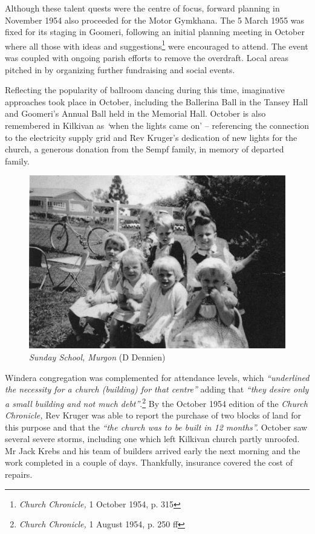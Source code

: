 Although these talent quests were the centre of focus, forward planning in November 1954 also proceeded for the Motor Gymkhana. The 5 March 1955 was fixed for its staging in Goomeri, following an initial planning meeting in October where all those with ideas and suggestions\footnote{\emph{Church Chronicle,} 1 October 1954, p. 315} were encouraged to attend. The event was coupled with ongoing parish efforts to remove the overdraft. Local areas pitched in by organizing further fundraising and social events.


Reflecting the popularity of ballroom dancing during this time, imaginative approaches took place in October, including the Ballerina Ball in the Tansey Hall and Goomeri's Annual Ball held in the Memorial Hall. October is also remembered in Kilkivan as \emph{`}when the lights came on' -- referencing the connection to the electricity supply grid and Rev Kruger's dedication of new lights for the church, a generous donation from the Sempf family, in memory of departed family.









\begin{figure}[!htb]
\begin{center}
\includegraphics[width=1.\textwidth,center]{../images/sundaySchoolMurgon.jpg}
\caption{{\itshape Sunday School, Murgon} {\scriptsize(D Dennien)}}
\end{center}
\end{figure}




Windera congregation was complemented for attendance levels, which \emph{``underlined the necessity for a church (building) for that centre''} adding that \emph{``they desire only a small building and not much debt''}.\footnote{\emph{Church Chronicle,} 1 August 1954, p. 250 ff} By the October 1954 edition of the \emph{Church Chronicle,} Rev Kruger was able to report the purchase of two blocks of land for this purpose and that the \emph{``the church was to be built in 12 months''.} October saw several severe storms, including one which left Kilkivan church partly unroofed. Mr Jack Krebs and his team of builders arrived early the next morning and the work completed in a couple of days. Thankfully, insurance covered the cost of repairs.


